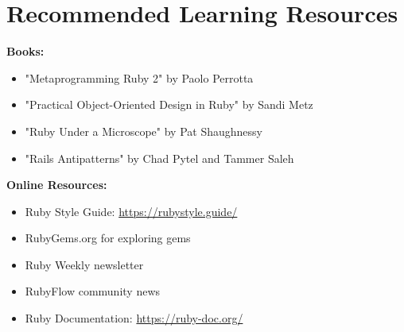 \documentclass[12pt,a4paper]{article}
\begin{document}
\section{Recommended Learning Resources}

\textbf{Books:}
\begin{itemize}
    \item "Metaprogramming Ruby 2" by Paolo Perrotta
    \item "Practical Object-Oriented Design in Ruby" by Sandi Metz
    \item "Ruby Under a Microscope" by Pat Shaughnessy
    \item "Rails Antipatterns" by Chad Pytel and Tammer Saleh
\end{itemize}

\textbf{Online Resources:}
\begin{itemize}
    \item Ruby Style Guide: \url{https://rubystyle.guide/}
    \item RubyGems.org for exploring gems
    \item Ruby Weekly newsletter
    \item RubyFlow community news
    \item Ruby Documentation: \url{https://ruby-doc.org/}
\end{itemize}
\end{document}
